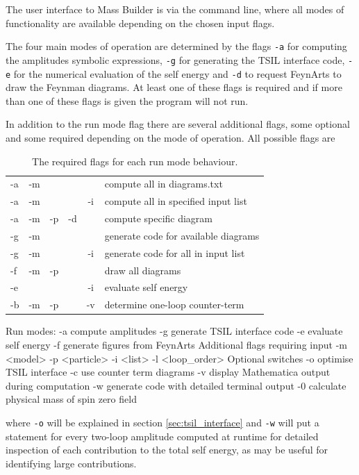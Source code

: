 The user interface to Mass Builder is via the command line, where all modes of functionality are available depending on the chosen input flags.

The four main modes of operation are determined by the flags \lstinline{-a} for computing the amplitudes symbolic expressions, \lstinline{-g} for generating the TSIL interface code, \lstinline{-e} for the numerical evaluation of the self energy and \lstinline{-d} to request FeynArts to draw the Feynman diagrams.  At least one of these flags is required and if more than one of these flags is given the program will not run.

In addition to the run mode flag there are several additional flags, some optional and some required depending on the mode of operation.  All possible flags are
\begin{table}
\caption{The required flags for each run mode behaviour.}
\begin{tabular}{l c c c c l} 
\hline
-a & -m & & & &compute all in diagrams.txt \\
-a & -m &  && -i&compute all in specified input list\\
-a & -m & -p & -d && compute specific diagram\\
-g & -m & & &  &generate code for available diagrams\\
-g & -m &  & & -i &generate code for all in input list\\
-f & -m & -p & & &draw all diagrams\\
-e &  & & & -i&evaluate self energy\\
-b & -m & -p & & -v&determine one-loop counter-term\\
\hline\end{tabular}
\end{table}
\begin{lstterm}
Run modes:
-a 		compute amplitudes
-g		generate TSIL interface code
-e		evaluate self energy
-f		generate figures from FeynArts
Additional flags requiring input
-m <model> 
-p <particle>
-i  <list>
-l <loop_order>
Optional switches
-o		optimise TSIL interface
-c		use counter term diagrams
-v		display Mathematica output during computation
-w		generate code with detailed terminal output
-0		calculate physical mass of spin zero field
\end{lstterm}
where \lstinline{-o} will be explained in section \ref{sec:tsil_interface} and \lstinline{-w} will put a  statement for every two-loop amplitude computed at runtime for detailed inspection of each contribution to the total self energy, as may be useful for identifying large contributions.


